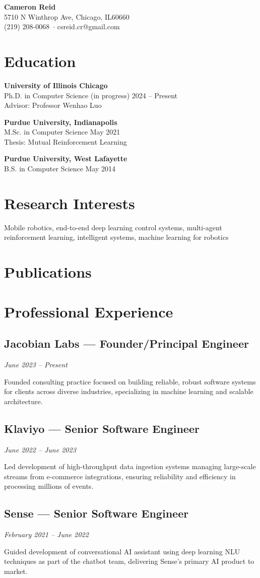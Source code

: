 \documentclass[11pt,letterpaper]{article}
\makeatletter
\newcommand{\street}{5710 N Winthrop Ave}
\newcommand{\city}{Chicago}
\newcommand{\state}{IL}
\newcommand{\zip}{60660}
\newcommand{\phone}{(219) 208-0068}
\newcommand{\email}{csreid.cr@gmail.com}
\newcommand{\makeaddress}{%
	\street, \city, \state \zip \\
	\phone\ $\cdot$ \email
}
\newcommand{\publist}{}
\newcommand{\makepublications}{%
	\begin{enumerate}[label={[\arabic*]}, leftmargin=2em]
		\publist
	\end{enumerate}
}
\newcommand{\job}[4]{%
	\subsection{#1 --- #2}
	\textit{#3}

	#4

	\vspace{0.1in}
}
\newcommand{\education}[4]{%
	\textbf{#1} \\
	#2 \hfill #3 \\
	#4
	\vspace{0.1in}
}
\makeatother
\begin{document}
\begin{center}
{\huge\bfseries{Cameron Reid}}\\[0.1in]
\makeaddress
\end{center}

\section{Education}

\education{University of Illinois Chicago}{Ph.D. in Computer Science (in progress)}{2024 -- Present}{Advisor: Professor Wenhao Luo}

\education{Purdue University, Indianapolis}{M.Sc. in Computer Science}{May 2021}{Thesis: Mutual Reinforcement Learning}

\education{Purdue University, West Lafayette}{B.S. in Computer Science}{May 2014}{}

\section{Research Interests}

Mobile robotics, end-to-end deep learning control systems, multi-agent reinforcement learning, intelligent systems, machine learning for robotics

\section{Publications}

\makepublications

\section{Professional Experience}

\job{Jacobian Labs}{Founder/Principal Engineer}{June 2023 -- Present}{Founded consulting practice focused on building reliable, robust software systems for clients across diverse industries, specializing in machine learning and scalable architecture.}

\job{Klaviyo}{Senior Software Engineer}{June 2022 -- June 2023}{Led development of high-throughput data ingestion systems managing large-scale streams from e-commerce integrations, ensuring reliability and efficiency in processing millions of events.}

\job{Sense}{Senior Software Engineer}{February 2021 -- June 2022}{Guided development of conversational AI assistant using deep learning NLU techniques as part of the chatbot team, delivering Sense's primary AI product to market.}
\end{document}
